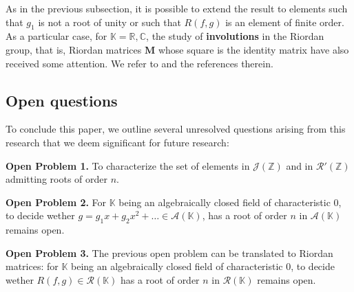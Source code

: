 \documentclass[preprint,12pt]{elsarticle}
\begin{document}
As in the previous subsection, it is possible to extend the result to elements such that $g_1$ is not a root of unity or such that $R(f,g)$ is an element of finite order. As a particular case, for $\mathbb K=\mathbb R,\mathbb C$, the study of \textbf{involutions} in the Riordan group, that is, Riordan matrices $\bm M$ whose square is the identity matrix have also received some attention. We refer to \cite{CK, CJKS, LMP2, LMP3} and the references therein.








\subsection{Open questions}

To conclude this paper, we outline several unresolved questions arising from this research that we deem significant for future research:


\noindent\textbf{Open Problem 1.} To characterize the set of elements in $\mathcal J(\mathbb Z)$ and in $\mathcal R'(\mathbb Z)$ admitting roots of order $n$.



\noindent\textbf{Open Problem 2.} For $\mathbb K$ being an algebraically closed field of characteristic 0, to decide wether $g=g_1x+g_2x^2+\ldots\in\mathcal A(\mathbb K)$,  has a root of order $n$ in $\mathcal A(\mathbb K)$ remains open.
 


\noindent\textbf{Open Problem 3.} The previous open problem can be translated to Riordan matrices: for  $\mathbb K$ being an algebraically closed field of characteristic 0, to decide wether $R(f,g)\in\mathcal R(\mathbb K)$ has a root of order $n$ in $\mathcal R(\mathbb K)$ remains open.

% 
%

\end{document}
